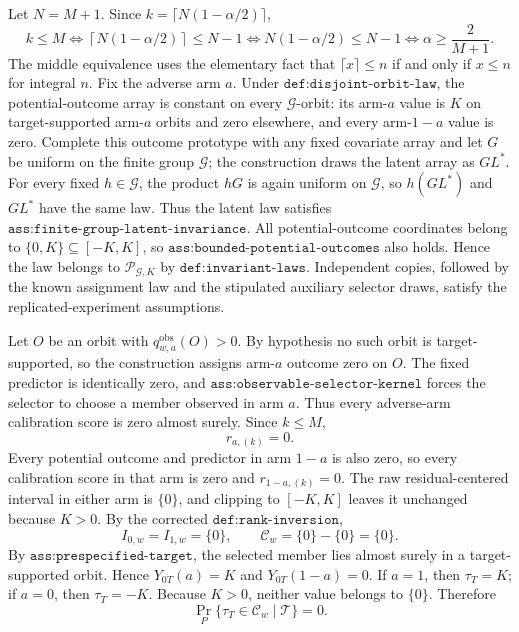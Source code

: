 Let \(N=M+1\). Since \(k=\lceil N(1-\alpha/2)\rceil\),
\[k\le M\iff \left\lceil N(1-\alpha/2)\right\rceil\le N-1\iff N(1-\alpha/2)\le N-1\iff \alpha\ge\frac{2}{M+1}.\]
The middle equivalence uses the elementary fact that \(\lceil x\rceil\le n\) if and only if \(x\le n\) for integral \(n\). Fix the adverse arm \(a\). Under \(\texttt{def:disjoint-orbit-law}\), the potential-outcome array is constant on every \(\mathcal G\)-orbit: its arm-\(a\) value is \(K\) on target-supported arm-\(a\) orbits and zero elsewhere, and every arm-\(1-a\) value is zero. Complete this outcome prototype with any fixed covariate array and let \(G\) be uniform on the finite group \(\mathcal G\); the construction draws the latent array as \(GL^*\). For every fixed \(h\in\mathcal G\), the product \(hG\) is again uniform on \(\mathcal G\), so \(h(GL^*)\) and \(GL^*\) have the same law. Thus the latent law satisfies \(\texttt{ass:finite-group-latent-invariance}\). All potential-outcome coordinates belong to \(\{0,K\}\subseteq[-K,K]\), so \(\texttt{ass:bounded-potential-outcomes}\) also holds. Hence the law belongs to \(\mathcal P_{\mathcal G,K}\) by \(\texttt{def:invariant-laws}\). Independent copies, followed by the known assignment law and the stipulated auxiliary selector draws, satisfy the replicated-experiment assumptions.

Let \(O\) be an orbit with \(q^{\mathrm{obs}}_{w,a}(O)>0\). By hypothesis no such orbit is target-supported, so the construction assigns arm-\(a\) outcome zero on \(O\). The fixed predictor is identically zero, and \(\texttt{ass:observable-selector-kernel}\) forces the selector to choose a member observed in arm \(a\). Thus every adverse-arm calibration score is zero almost surely. Since \(k\le M\),
\[r_{a,(k)}=0.\]
Every potential outcome and predictor in arm \(1-a\) is also zero, so every calibration score in that arm is zero and \(r_{1-a,(k)}=0\). The raw residual-centered interval in either arm is \(\{0\}\), and clipping to \([-K,K]\) leaves it unchanged because \(K>0\). By the corrected \(\texttt{def:rank-inversion}\),
\[I_{0,w}=I_{1,w}=\{0\},\qquad \mathcal C_w=\{0\}-\{0\}=\{0\}.\]
By \(\texttt{ass:prespecified-target}\), the selected member lies almost surely in a target-supported orbit. Hence \(Y_{0T}(a)=K\) and \(Y_{0T}(1-a)=0\). If \(a=1\), then \(\tau_T=K\); if \(a=0\), then \(\tau_T=-K\). Because \(K>0\), neither value belongs to \(\{0\}\). Therefore
\[\Pr_P\{\tau_T\in\mathcal C_w\mid\mathcal T\}=0.\]
